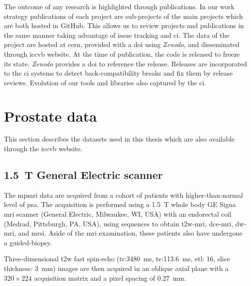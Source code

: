 The outcome of any research is highlighted through publications.
In our work strategy publications of each project are sub-projects of the main projects which are both hosted in GitHub.
This allows us to review projects and publications in the same manner taking advantage of issue tracking and \acs{ci}.
The data of the project are hosted at \acs{cern}, provided with a \acs{doi} using \emph{Zenodo}, and disseminated through \acs{iccvb} website.
At the time of publication, the code is released to freeze its state. 
\emph{Zenodo} provides a \acs{doi} to reference the release.
Releases are incorporated to the \acs{ci} systems to detect back-compatibility breaks and fix them by release reviews.
Evolution of our tools and libraries also captured by the \acs{ci}.

\section{Prostate data}
This section describes the datasets used in this thesis which are also available through the \acs{iccvb} website.

\subsection{\SI{1.5}{\tesla} General Electric scanner}

The \ac{mpmri} data are acquired from a cohort of patients with higher-than-normal level of \ac{psa}.
The acquisition is performed using a \SI{1.5}{\tesla} whole body GE Signa \ac{mri} scanner (General Electric, Milwaukee, WI, USA) with an endorectal coil (Medrad, Pittsburgh, PA, USA), using sequences to obtain \ac{t2w}-\ac{mri}, \ac{dce}-\ac{mri}, \ac{dw}-\ac{mri}, and \ac{mrsi}.
Aside of the \ac{mri} examination, these patients also have undergone a guided-biopsy.

Three-dimensional \ac{t2w} fast spin-echo (\ac{tr}:\SI{3480}{\ms}, \ac{te}:\SI{113.6}{\ms}, \ac{etl}: 16, slice thickness: \SI{3}{\mm}) images are then acquired in an oblique axial plane with a  $320 \times 224$ acquisition matrix and a pixel spacing of \SI{0.27}{\milli\metre}.

